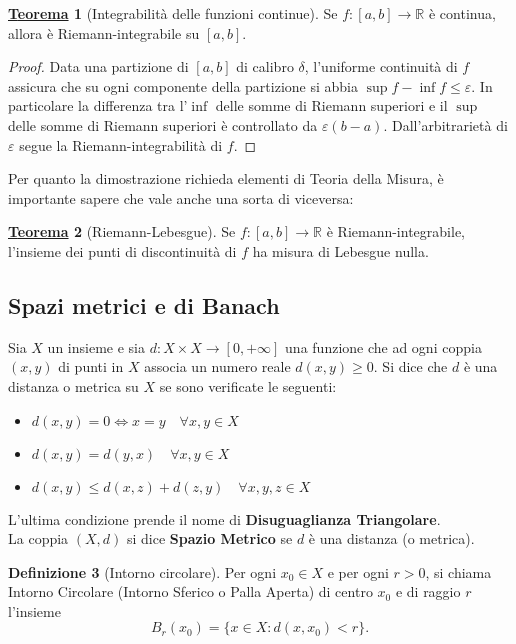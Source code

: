 \documentclass[a4paper,twoside]{article}
\renewcommand{\epsilon}{\varepsilon}
\newcommand{\R}{\mathbb{R}}
\theoremstyle{definition}
\newtheorem{theorem}{\color{Red}\underline{\textrm Teorema}}
\newtheorem{definizione}[theorem]{Definizione}
\numberwithin{theorem}{section}
\begin{document}
\begin{theorem}[Integrabilità delle funzioni continue]
Se $f:[a,b]\to\R$ è continua, allora è Riemann-integrabile su $[a,b]$.
\end{theorem}
\begin{proof}
Data una partizione di $[a,b]$ di calibro $\delta$, l'uniforme continuità di $f$ assicura che su ogni componente della partizione si abbia $\sup f-\inf f \leq \epsilon$. In particolare la differenza tra l'$\inf$ delle somme di Riemann superiori e il $\sup$ delle somme di Riemann superiori è controllato da $\epsilon(b-a)$. Dall'arbitrarietà di $\epsilon$ segue la Riemann-integrabilità di $f$. 
\end{proof}

Per quanto la dimostrazione richieda elementi di Teoria della Misura, è importante sapere che vale anche una sorta di viceversa:

\begin{theorem}[Riemann-Lebesgue] Se $f:[a,b]\to\mathbb{R}$ è Riemann-integrabile, l'insieme dei punti di discontinuità di $f$ ha misura di Lebesgue nulla. 
\end{theorem}



\subsection{Spazi metrici e di Banach}
Sia $X$ un insieme e sia $d:X \times X\to [0,+\infty]$ una funzione che ad ogni coppia $(x,y)$ di punti in $X$ associa un numero reale $d(x,y)\geq0$. Si dice che $d$ è una distanza o metrica su $X$ se sono verificate le seguenti:
\begin{itemize}
\item  $d(x,y)=0 \Leftrightarrow x=y\quad\forall x,y\in X$
\item $d(x,y)=d(y,x)\quad\forall x,y\in X$
\item $d(x,y)\leq d(x,z)+d(z,y)\quad\forall x,y,z\in X$
\end{itemize}
L'ultima condizione prende il nome di \textbf{Disuguaglianza Triangolare}.\\
La coppia $(X,d)$ si dice \textbf{Spazio Metrico} se $d$ è una distanza (o metrica).

\begin{definizione}[Intorno circolare]
Per ogni $x_0\in X$ e per ogni $r>0$, si chiama Intorno Circolare (Intorno Sferico o Palla Aperta) di centro $x_0$ e di raggio $r$ l'insieme $$B_r(x_0)=\{x\in X: d(x,x_0)<r\}.$$
\end{definizione}
\end{document}
